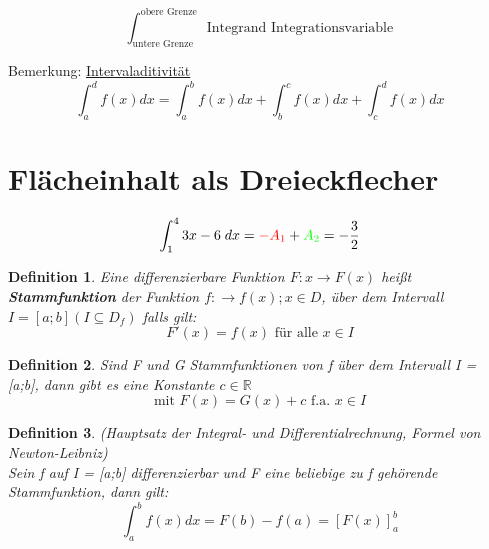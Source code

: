 \documentclass{article}
\newtheorem{definition}{Definition}
\begin{document}
\[\int_{\text{untere Grenze}}^{\text{obere Grenze}}\text{ Integrand Integrationsvariable}\]

Bemerkung: \underline{Intervaladitivität}
\[\int_a^d f(x) dx = \int_a^b f(x) dx+ \int_b^c f(x) dx + \int_c^d f(x) dx\]

\section{Flächeinhalt als Dreieckflecher}
\[\int_1^4 3x-6 \;dx =\textcolor{red}{-A_1}+\textcolor{green}{A_2} = -\frac 32\]


\begin{definition}Eine differenzierbare Funktion $ F: x \rightarrow F(x)$ heißt \textbf{Stammfunktion} der Funktion $f: \rightarrow f(x); x \in D$, über dem Intervall $ I = [a;b] (I \subseteq D_f)$ falls gilt:
\[F'(x) = f(x) \text{ für alle } x\in I\]

\end{definition}

\begin{definition}
Sind F und G Stammfunktionen von f über dem Intervall I = [a;b], dann gibt es eine Konstante $c \in \mathbb{R}$ 
\[\text{mit } F(x) = G(x) + c \text{ f.a. } x\in I\]
\end{definition}

\begin{definition}(Hauptsatz der Integral- und Differentialrechnung, Formel von Newton-Leibniz)
\\
Sein f auf I = [a;b] differenzierbar und F eine beliebige zu f gehörende Stammfunktion, dann gilt: 
\[ \int_a^bf(x) dx = F(b) - f(a) = [F(x)]_a^b\]

\end{definition}
\end{document}
